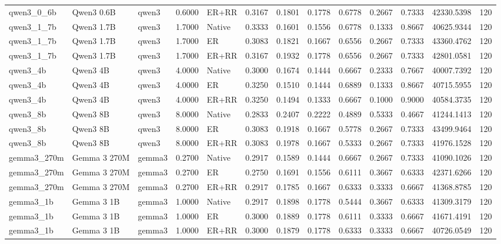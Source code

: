 \begin{tabular}{lllrlrrrrrrrr}
qwen3_0_6b & Qwen3 0.6B & qwen3 & 0.6000 & ER+RR & 0.3167 & 0.1801 & 0.1778 & 0.6778 & 0.2667 & 0.7333 & 42330.5398 & 120 \\
qwen3_1_7b & Qwen3 1.7B & qwen3 & 1.7000 & Native & 0.3333 & 0.1601 & 0.1556 & 0.6778 & 0.1333 & 0.8667 & 40625.9344 & 120 \\
qwen3_1_7b & Qwen3 1.7B & qwen3 & 1.7000 & ER & 0.3083 & 0.1821 & 0.1667 & 0.6556 & 0.2667 & 0.7333 & 43360.4762 & 120 \\
qwen3_1_7b & Qwen3 1.7B & qwen3 & 1.7000 & ER+RR & 0.3167 & 0.1932 & 0.1778 & 0.6556 & 0.2667 & 0.7333 & 42801.0581 & 120 \\
qwen3_4b & Qwen3 4B & qwen3 & 4.0000 & Native & 0.3000 & 0.1674 & 0.1444 & 0.6667 & 0.2333 & 0.7667 & 40007.7392 & 120 \\
qwen3_4b & Qwen3 4B & qwen3 & 4.0000 & ER & 0.3250 & 0.1510 & 0.1444 & 0.6889 & 0.1333 & 0.8667 & 40715.5955 & 120 \\
qwen3_4b & Qwen3 4B & qwen3 & 4.0000 & ER+RR & 0.3250 & 0.1494 & 0.1333 & 0.6667 & 0.1000 & 0.9000 & 40584.3735 & 120 \\
qwen3_8b & Qwen3 8B & qwen3 & 8.0000 & Native & 0.2833 & 0.2407 & 0.2222 & 0.4889 & 0.5333 & 0.4667 & 41244.1413 & 120 \\
qwen3_8b & Qwen3 8B & qwen3 & 8.0000 & ER & 0.3083 & 0.1918 & 0.1667 & 0.5778 & 0.2667 & 0.7333 & 43499.9464 & 120 \\
qwen3_8b & Qwen3 8B & qwen3 & 8.0000 & ER+RR & 0.3083 & 0.1978 & 0.1667 & 0.5333 & 0.2667 & 0.7333 & 41976.1528 & 120 \\
gemma3_270m & Gemma 3 270M & gemma3 & 0.2700 & Native & 0.2917 & 0.1589 & 0.1444 & 0.6667 & 0.2667 & 0.7333 & 41090.1026 & 120 \\
gemma3_270m & Gemma 3 270M & gemma3 & 0.2700 & ER & 0.2750 & 0.1691 & 0.1556 & 0.6111 & 0.3667 & 0.6333 & 42371.6266 & 120 \\
gemma3_270m & Gemma 3 270M & gemma3 & 0.2700 & ER+RR & 0.2917 & 0.1785 & 0.1667 & 0.6333 & 0.3333 & 0.6667 & 41368.8785 & 120 \\
gemma3_1b & Gemma 3 1B & gemma3 & 1.0000 & Native & 0.2917 & 0.1898 & 0.1778 & 0.5444 & 0.3667 & 0.6333 & 41309.3179 & 120 \\
gemma3_1b & Gemma 3 1B & gemma3 & 1.0000 & ER & 0.3000 & 0.1889 & 0.1778 & 0.6111 & 0.3333 & 0.6667 & 41671.4191 & 120 \\
gemma3_1b & Gemma 3 1B & gemma3 & 1.0000 & ER+RR & 0.3000 & 0.1879 & 0.1778 & 0.6333 & 0.3333 & 0.6667 & 40726.0549 & 120 \\

\end{tabular}
